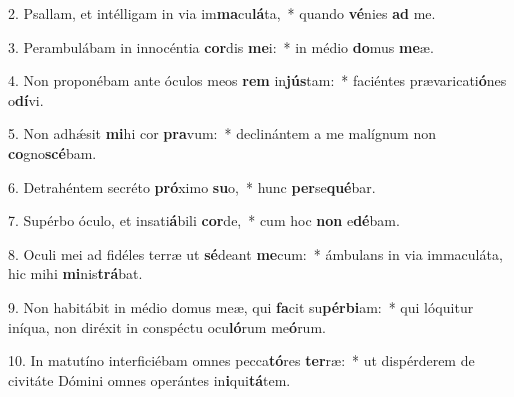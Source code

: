 2. Psallam, et intélligam in via im\textbf{ma}cu\textbf{lá}ta,~*  quando \textbf{vé}nies \textbf{ad} me.\

3. Perambulábam in innocéntia \textbf{cor}dis \textbf{me}i:~*  in médio \textbf{do}mus \textbf{me}æ.\

4. Non proponébam ante óculos meos \textbf{rem} in\textbf{jús}tam:~*  faciéntes prævaricati\textbf{ó}nes o\textbf{dí}vi.\

5. Non adhǽsit \textbf{mi}hi cor \textbf{pra}vum:~*  declinántem a me malígnum non \textbf{co}gno\textbf{scé}bam.\

6. Detrahéntem secréto \textbf{pró}ximo \textbf{su}o,~*  hunc \textbf{per}se\textbf{qué}bar.\

7. Supérbo óculo, et insati\textbf{á}bili \textbf{cor}de,~*  cum hoc \textbf{non} e\textbf{dé}bam.\

8. Oculi mei ad fidéles terræ ut \textbf{sé}deant \textbf{me}cum:~*  ámbulans in via immaculáta, hic mihi \textbf{mi}nis\textbf{trá}bat.\

9. Non habitábit in médio domus meæ, qui \textbf{fa}cit su\textbf{pér}\textbf{bi}am:~*  qui lóquitur iníqua, non diréxit in conspéctu ocu\textbf{ló}rum me\textbf{ó}rum.\

10. In matutíno interficiébam omnes pecca\textbf{tó}res \textbf{ter}ræ:~*  ut dispérderem de civitáte Dómini omnes operántes in\textbf{i}qui\textbf{tá}tem.\

